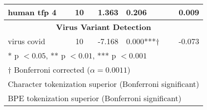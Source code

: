 \begin{table}[]
\begin{center}
\begin{tabular}{@{}lcrlr@{}}
human tfp 4 & 10 & 1.363 & 0.206 & 0.009 \\
\midrule
\multicolumn{5}{c}{\textbf{Virus Variant Detection}} \\
\midrule
\rowcolor{magenta!25}virus covid & 10 & -7.168 & 0.000***† & -0.073 \\
\bottomrule
\multicolumn{5}{l}{* p $< 0.05$, ** p $< 0.01$, *** p $< 0.001$} \\
\multicolumn{5}{l}{† Bonferroni corrected ($\alpha = 0.0011$)} \\
\multicolumn{5}{l}{\cellcolor{teal!25} Character tokenization superior (Bonferroni significant)} \\
\multicolumn{5}{l}{\cellcolor{magenta!25} BPE tokenization superior (Bonferroni significant)}
\end{tabular}
\end{center}
\end{table}